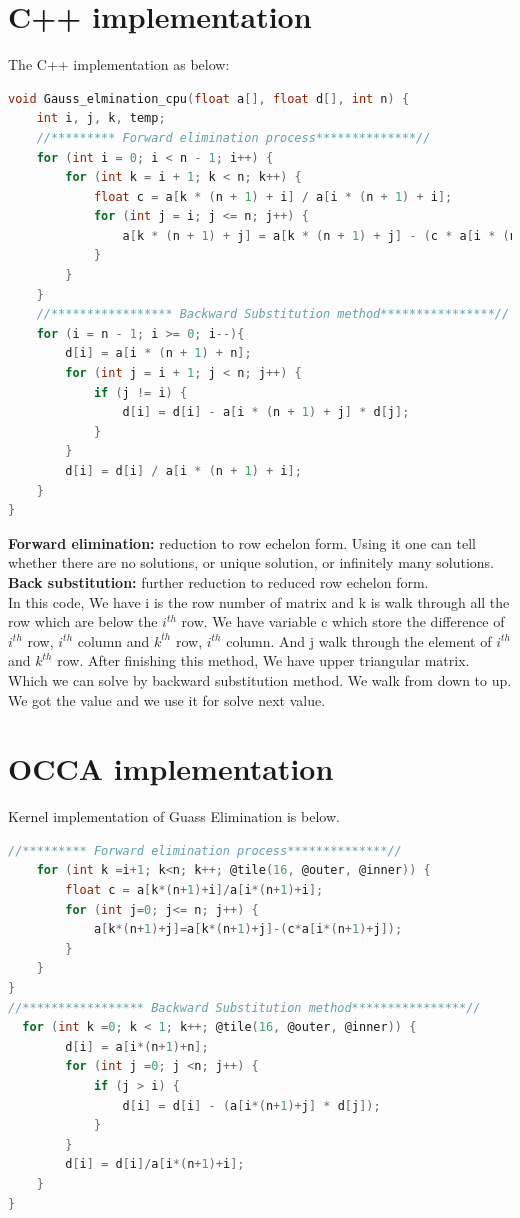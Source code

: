 \section{C++ implementation}
The C++ implementation as below:
\begin{lstlisting}[language=C, caption=Gauss elimination in C++]
	void Gauss_elmination_cpu(float a[], float d[], int n) {
	int i, j, k, temp;
	//********* Forward elimination process**************//
	for (int i = 0; i < n - 1; i++) {
		for (int k = i + 1; k < n; k++) {
			float c = a[k * (n + 1) + i] / a[i * (n + 1) + i];
			for (int j = i; j <= n; j++) {
				a[k * (n + 1) + j] = a[k * (n + 1) + j] - (c * a[i * (n + 1) + j]);
			}
		}
	}
    //***************** Backward Substitution method****************//
	for (i = n - 1; i >= 0; i--){
		d[i] = a[i * (n + 1) + n];
		for (int j = i + 1; j < n; j++) {
			if (j != i) {
				d[i] = d[i] - a[i * (n + 1) + j] * d[j];
			}
		}
		d[i] = d[i] / a[i * (n + 1) + i];
	}
}
\end{lstlisting}
\textbf{Forward elimination:} reduction to row echelon form. Using it one can tell whether there are no solutions, or unique solution, or infinitely many solutions.\\
\textbf{Back substitution:} further reduction to reduced row echelon form.\\
In this code, We have i is the row number of matrix and k is walk through all the row which are below the $i^{th}$  row. We have variable c which store the difference of $i^{th}$ row, $i^{th}$ column and $k^{th}$ row, $i^{th}$  column. And j walk through the element of $i^{th}$ and $k^{th}$ row. After finishing this method, We have upper triangular matrix.\\
Which we can solve by backward substitution method. We walk from down to up. We got the value and we use it for solve next value.

\section{OCCA implementation}
Kernel implementation of Guass Elimination is below.
\begin{lstlisting}[language=C, caption=Gauss elimination in OCCA]
    //********* Forward elimination process**************//
    for (int k =i+1; k<n; k++; @tile(16, @outer, @inner)) {
        float c = a[k*(n+1)+i]/a[i*(n+1)+i];
        for (int j=0; j<= n; j++) {
            a[k*(n+1)+j]=a[k*(n+1)+j]-(c*a[i*(n+1)+j]);
        }
    }
}
//***************** Backward Substitution method****************//
  for (int k =0; k < 1; k++; @tile(16, @outer, @inner)) {
        d[i] = a[i*(n+1)+n];
    	for (int j =0; j <n; j++) {
            if (j > i) {
                d[i] = d[i] - (a[i*(n+1)+j] * d[j]);
            }
        }
    	d[i] = d[i]/a[i*(n+1)+i];
    }
}
\end{lstlisting}

